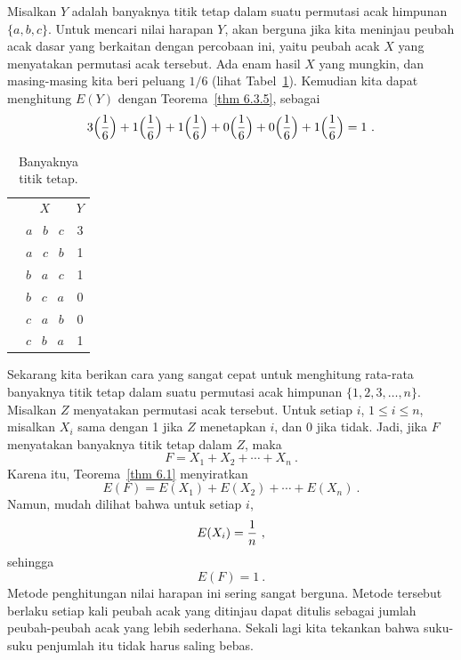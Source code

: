 \begin{example}\label{exam 6.1} Misalkan $Y$ adalah banyaknya titik tetap dalam suatu
permutasi acak himpunan $\{a,b,c\}$. Untuk mencari nilai harapan $Y$, akan berguna
jika kita meninjau peubah acak dasar yang berkaitan dengan percobaan ini, yaitu peubah
acak $X$ yang menyatakan permutasi acak tersebut. Ada enam hasil $X$ yang mungkin,
dan masing-masing kita beri peluang $1/6$ (lihat Tabel~\ref{table 6.3}). Kemudian kita
dapat menghitung $E(Y)$ dengan Teorema~\ref{thm 6.3.5}, sebagai
$$3\Bigl({1\over 6}\Bigr) + 1\Bigl({1\over 6}\Bigr) + 1\Bigl({1\over 6}\Bigr) +
0\Bigl({1\over 6}\Bigr) +  0\Bigl({1\over 6}\Bigr) + 1\Bigl({1\over 6}\Bigr) = 1\ .
$$
\begin{table}
\centering
\begin{tabular}{ccc} &                          & \\ 
\hline &$X$                 & $Y$ \\
\hline  &$a\;\;\;b\;\;\;   c$       & 3 \\  &$a\;\;\; c\;\;\;  b$       & 1 \\ 
&$b\;\;\; a\;\;\;  c$       & 1 \\  &$b\;\;\; c\;\;\;  a$       & 0 \\  &$c\;\;\;
a\;\;\;  b$       & 0 \\  &$c\;\;\; b\;\;\;  a$       & 1 \\ 
\hline
\end{tabular}
\caption{Banyaknya titik tetap.}
\label{table 6.3}
\end{table}

\par Sekarang kita berikan cara yang sangat cepat untuk menghitung rata-rata banyaknya
titik tetap dalam suatu permutasi acak himpunan $\{1, 2, 3, \ldots, n\}$. Misalkan
$Z$ menyatakan permutasi acak tersebut. Untuk setiap $i$, $1 \le i \le n$, misalkan
$X_i$ sama dengan 1 jika $Z$ menetapkan $i$, dan 0 jika tidak. Jadi, jika $F$
menyatakan banyaknya titik tetap dalam $Z$, maka
$$F = X_1 + X_2 + \cdots + X_n\ .$$ Karena itu, Teorema~\ref{thm 6.1} menyiratkan
$$E(F) = E(X_1) + E(X_2) + \cdots + E(X_n)\ .$$ Namun, mudah dilihat bahwa untuk
setiap $i$,
$$E(X_i) = {1\over n}\ ,$$ sehingga
$$E(F) = 1\ .$$ Metode penghitungan nilai harapan ini sering sangat berguna. Metode
tersebut berlaku setiap kali peubah acak yang ditinjau dapat ditulis sebagai jumlah
peubah-peubah acak yang lebih sederhana. Sekali lagi kita tekankan bahwa suku-suku
penjumlah itu tidak harus saling bebas.
\end{example}

